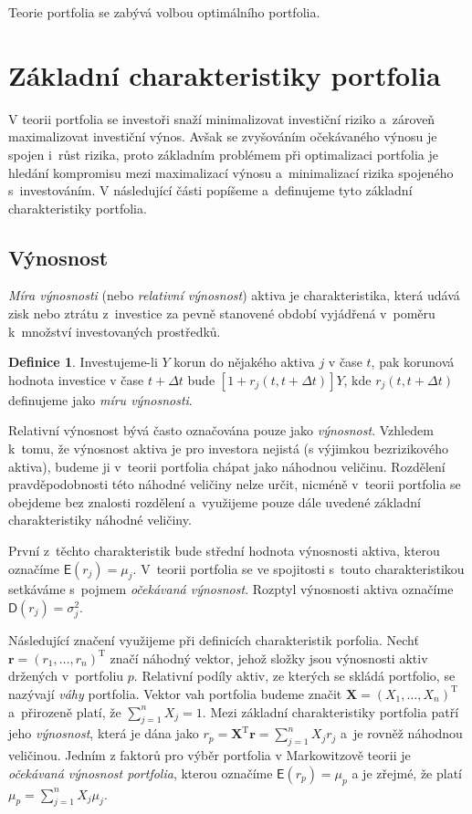 \documentclass[a4paper,12pt]{report}
\theoremstyle{definition} \newtheorem{definice}[veta]{Definice}
\theoremstyle{remark}
\begin{document}
Teorie portfolia se zabývá volbou optimálního portfolia.



\section{Základní charakteristiky portfolia}\label{charakteristiky_portfolia}
V teorii portfolia se investoři snaží minimalizovat investiční riziko a~zároveň maximalizovat investiční výnos. 
Avšak se zvyšováním očekávaného výnosu je spojen i~růst rizika, proto základním problémem při optimalizaci portfolia je hledání kompromisu mezi maximalizací výnosu a~minimalizací rizika spojeného s~investováním.  
V následující části popíšeme a~definujeme tyto základní charakteristiky portfolia.

\subsection{Výnosnost}
\textit{Míra výnosnosti} (nebo \textit{relativní výnosnost}) aktiva je charakteristika, která udává zisk nebo ztrátu z~investice za pevně stanovené období vyjádřená v~poměru k~množství investovaných prostředků.

\begin{definice}
Investujeme-li $Y$ korun do nějakého aktiva $j$ v čase $t$, pak korunová hodnota investice v čase $t+\Delta t$ bude $[1+r_j(t,t+\Delta t)]Y$, kde  $r_j(t,t+\Delta t)$ definujeme jako \textit{míru výnosnosti}.  
\end{definice}
 
Relativní výnosnost bývá často označována pouze jako \textit{výnosnost}.
Vzhledem k~tomu, že výnosnost aktiva je pro investora nejistá (s výjimkou bezrizikového aktiva), budeme ji v~teorii portfolia chápat jako náhodnou veličinu. %
Rozdělení pravděpodobnosti této náhodné veličiny nelze určit, nicméně v~teorii portfolia se obejdeme bez znalosti rozdělení a~využijeme pouze dále uvedené základní charakteristiky náhodné veličiny.

První z~těchto charakteristik bude střední hodnota výnosnosti aktiva, kterou označíme $\mathsf{E}(r_j)=\mu_j$.
V~teorii portfolia se ve spojitosti s~touto charakteristikou setkáváme s~pojmem \textit{očekávaná výnosnost}.
Rozptyl výnosnosti aktiva označíme $\mathsf{D}(r_j)=\sigma_j^2$.

Následující značení využijeme při definicích charakteristik porfolia.
Nechť $\boldsymbol{r}=(r_1,\dots,r_n)^\mathrm{T}$ značí náhodný vektor, jehož složky jsou výnosnosti aktiv držených v~portfoliu $p$.
Relativní podíly aktiv, ze kterých se skládá portfolio, se nazývají \textit{váhy} portfolia.
Vektor vah portfolia budeme značit $\boldsymbol{X}=(X_1,\dots,X_n)^\mathrm{T}$ a~přirozeně platí, že $\sum_{j=1}^nX_j=1$. 
Mezi základní charakteristiky portfolia patří jeho \textit{výnosnost}, která je dána jako $r_p=\boldsymbol{X}^\mathrm{T}\boldsymbol{r}=\sum_{j=1}^nX_jr_j$ a~je rovněž náhodnou veličinou.   
Jedním z faktorů pro výběr portfolia v Markowitzově teorii je \textit{očekávaná výnosnost portfolia}, kterou označíme $\mathsf{E}(r_p)=\mu_p$ a je zřejmé, že platí $\mu_p=\sum_{j=1}^nX_j\mu_j$.
\end{document}
